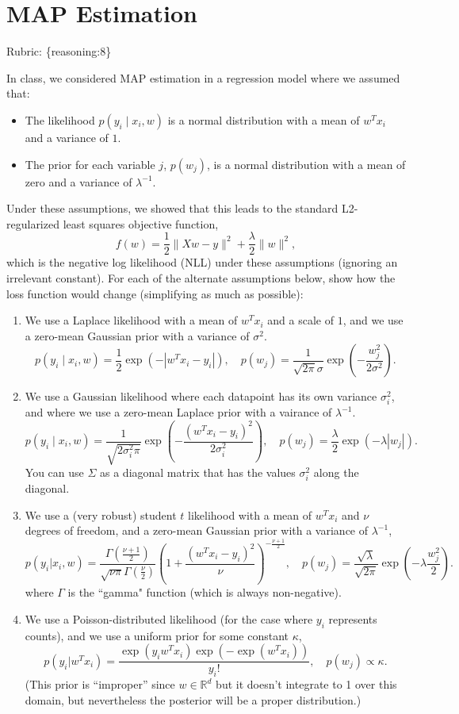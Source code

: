 \documentclass{article}
\def\rubric#1{\gre{Rubric: \{#1\}}}{}
\def\blu#1{{\color{blu}#1}}
\def\gre#1{{\color{gre}#1}}
\def\norm#1{\|#1\|}
\def\R{\mathbb{R}}
\def\items#1{\begin{itemize}#1\end{itemize}}
\def\enum#1{\begin{enumerate}#1\end{enumerate}}
\begin{document}
\section{MAP Estimation}
\rubric{reasoning:8}

In class, we considered MAP estimation in a regression model where we assumed that:
\items{
\item The likelihood $p(y_i \mid x_i, w)$ is a normal distribution with a mean of $w^Tx_i$ and a variance of $1$.
\item The prior for each variable $j$, $p(w_j)$, is a normal distribution with a mean of zero and a variance of $\lambda^{-1}$.
}
Under these assumptions, we showed that this leads to the standard L2-regularized least squares objective function,
\[
f(w) = \frac{1}{2}\norm{Xw - y}^2 + \frac \lambda 2 \norm{w}^2,
\]
which is the negative log likelihood (NLL) under these assumptions (ignoring an irrelevant constant).
\blu{For each of the alternate assumptions below, show how the loss function would change} (simplifying as much as possible):
\enum{
\item We use a Laplace likelihood with a mean of $w^Tx_i$ and a scale of $1$, and we use a zero-mean Gaussian prior with a variance of $\sigma^2$.
\[
p(y_i \mid x_i, w) = \frac 1 2 \exp(-|w^Tx_i - y_i|), \quad p(w_j) = \frac{1}{\sqrt{2\pi}\sigma}\exp\left(-\frac{w_j^2}{2\sigma^2}\right).
\]
\item We use a Gaussian likelihood where each datapoint has its own variance $\sigma_i^2$, and where we use a zero-mean Laplace prior with a vairance of $\lambda^{-1}$.
\[
p(y_i \mid x_i,w) = \frac{1}{\sqrt{2\sigma_i^2\pi}}\exp\left(-\frac{(w^Tx_i - y_i)^2}{2\sigma_i^2}\right), \quad p(w_j) = \frac{\lambda}{2}\exp(-\lambda|w_j|).
\]
You can use $\Sigma$ as a diagonal matrix that has the values $\sigma_i^2$ along the diagonal.
\item We use a (very robust) student $t$ likelihood with a mean of $w^Tx_i$ and $\nu$ degrees of freedom, and a zero-mean Gaussian prior with a variance of $\lambda^{-1}$,
\[
p(y_i | x_i, w) = \frac{\Gamma\left(\frac{\nu + 1}{2}\right)}{\sqrt{\nu\pi}\Gamma\left(\frac \nu 2\right)}\left(1 + \frac{(w^Tx_i - y_i)^2}{\nu}\right)^{-\frac{\nu+1}{2}}, \quad p(w_j) = \frac{\sqrt{\lambda}}{\sqrt{2\pi}}\exp\left(-\lambda\frac{w_j^2}{2}\right).
\]
where $\Gamma$ is the ``gamma" function (which is always non-negative).
\item We use a Poisson-distributed likelihood (for the case where $y_i$ represents counts), and we use a uniform prior for some constant $\kappa$,
\[
p(y_i | w^Tx_i) = \frac{\exp(y_iw^Tx_i)\exp(-\exp(w^Tx_i))}{y_i!}, \quad p(w_j) \propto \kappa.
\]
(This prior is 	``improper'' since $w\in\R^d$ but it doesn't integrate to 1 over this domain, but nevertheless the posterior will be a proper distribution.)
}
\end{document}
